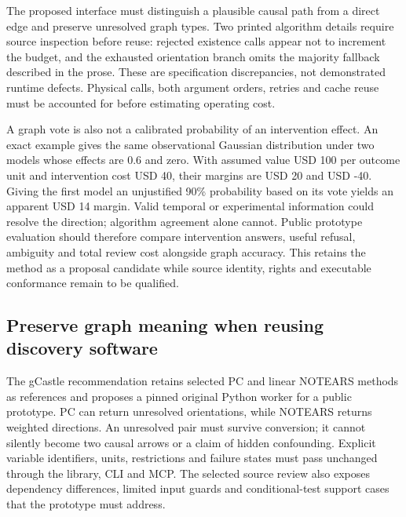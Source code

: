 The proposed interface must distinguish a plausible causal path from a
direct edge and preserve unresolved graph types. Two printed algorithm
details require source inspection before reuse: rejected existence calls
appear not to increment the budget, and the exhausted orientation branch
omits the majority fallback described in the prose. These are
specification discrepancies, not demonstrated runtime defects. Physical
calls, both argument orders, retries and cache reuse must be accounted
for before estimating operating cost.
\citep{exec20_expert_averaging_reference}

A graph vote is also not a calibrated probability of an intervention
effect. An exact example gives the same observational Gaussian
distribution under two models whose effects are 0.6 and zero. With
assumed value USD 100 per outcome unit and intervention cost USD 40,
their margins are USD 20 and USD -40. Giving the first model an
unjustified 90\% probability based on its vote yields an apparent USD 14
margin. Valid temporal or experimental information could resolve the
direction; algorithm agreement alone cannot. Public prototype evaluation
should therefore compare intervention answers, useful refusal, ambiguity
and total review cost alongside graph accuracy. This retains the method
as a proposal candidate while source identity, rights and executable
conformance remain to be qualified.
\citep{exec20_expert_averaging_reference}

\hypertarget{preserve-graph-meaning-when-reusing-discovery-software}{%
\subsection{Preserve graph meaning when reusing discovery
software}\label{preserve-graph-meaning-when-reusing-discovery-software}}

The gCastle recommendation retains selected PC and linear NOTEARS
methods as references and proposes a pinned original Python worker for a
public prototype. PC can return unresolved orientations, while NOTEARS
returns weighted directions. An unresolved pair must survive conversion;
it cannot silently become two causal arrows or a claim of hidden
confounding. Explicit variable identifiers, units, restrictions and
failure states must pass unchanged through the library, CLI and MCP. The
selected source review also exposes dependency differences, limited
input guards and conditional-test support cases that the prototype must
address. \citep{exec20_gcastle_source}

